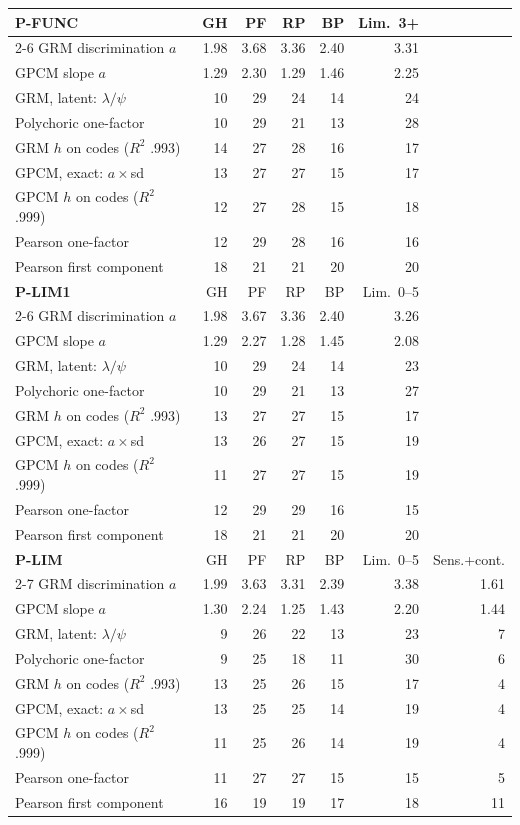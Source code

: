 \begin{center}\footnotesize\setlength{\tabcolsep}{4pt}
\begin{tabular}{@{}lrrrrrr@{}}
\toprule
\textbf{P-FUNC} & GH & PF & RP & BP & Lim.\ 3+ &  \\
\cmidrule(l){2-6}
GRM discrimination $a$ & 1.98 & 3.68 & 3.36 & 2.40 & 3.31 &  \\
GPCM slope $a$ & 1.29 & 2.30 & 1.29 & 1.46 & 2.25 &  \\
GRM, latent: $\lambda/\psi$ & 10 & 29 & 24 & 14 & 24 &  \\
Polychoric one-factor & 10 & 29 & 21 & 13 & 28 &  \\
GRM $h$ on codes ($R^2$ .993) & 14 & 27 & 28 & 16 & 17 &  \\
GPCM, exact: $a\times$sd & 13 & 27 & 27 & 15 & 17 &  \\
GPCM $h$ on codes ($R^2$ .999) & 12 & 27 & 28 & 15 & 18 &  \\
Pearson one-factor & 12 & 29 & 28 & 16 & 16 &  \\
Pearson first component & 18 & 21 & 21 & 20 & 20 &  \\
\midrule
\textbf{P-LIM1} & GH & PF & RP & BP & Lim.\ 0--5 &  \\
\cmidrule(l){2-6}
GRM discrimination $a$ & 1.98 & 3.67 & 3.36 & 2.40 & 3.26 &  \\
GPCM slope $a$ & 1.29 & 2.27 & 1.28 & 1.45 & 2.08 &  \\
GRM, latent: $\lambda/\psi$ & 10 & 29 & 24 & 14 & 23 &  \\
Polychoric one-factor & 10 & 29 & 21 & 13 & 27 &  \\
GRM $h$ on codes ($R^2$ .993) & 13 & 27 & 27 & 15 & 17 &  \\
GPCM, exact: $a\times$sd & 13 & 26 & 27 & 15 & 19 &  \\
GPCM $h$ on codes ($R^2$ .999) & 11 & 27 & 27 & 15 & 19 &  \\
Pearson one-factor & 12 & 29 & 29 & 16 & 15 &  \\
Pearson first component & 18 & 21 & 21 & 20 & 20 &  \\
\midrule
\textbf{P-LIM} & GH & PF & RP & BP & Lim.\ 0--5 & Sens.+cont. \\
\cmidrule(l){2-7}
GRM discrimination $a$ & 1.99 & 3.63 & 3.31 & 2.39 & 3.38 & 1.61 \\
GPCM slope $a$ & 1.30 & 2.24 & 1.25 & 1.43 & 2.20 & 1.44 \\
GRM, latent: $\lambda/\psi$ & 9 & 26 & 22 & 13 & 23 & 7 \\
Polychoric one-factor & 9 & 25 & 18 & 11 & 30 & 6 \\
GRM $h$ on codes ($R^2$ .993) & 13 & 25 & 26 & 15 & 17 & 4 \\
GPCM, exact: $a\times$sd & 13 & 25 & 25 & 14 & 19 & 4 \\
GPCM $h$ on codes ($R^2$ .999) & 11 & 25 & 26 & 14 & 19 & 4 \\
Pearson one-factor & 11 & 27 & 27 & 15 & 15 & 5 \\
Pearson first component & 16 & 19 & 19 & 17 & 18 & 11 \\
\bottomrule
\end{tabular}
\end{center}
